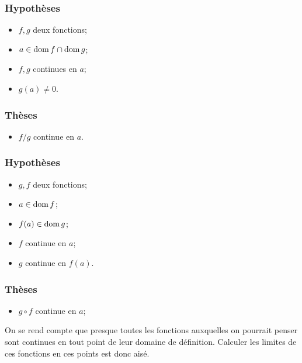 \documentclass[main.tex]{subfiles}
\begin{document}
\begin{proposition}

    \subsubsection{Hypothèses}
    \begin{itemize}
        \item $f, g$ deux fonctions;
        \item $a \in \operatorname{dom} f \cap \operatorname{dom} g$;
        \item $f ,g$ continues en $a$;
        \item $g(a) \ne 0$.
    \end{itemize}

    \subsubsection{Thèses}
    \begin{itemize}
        \item $f/g$ continue en $a$.
    \end{itemize}
\end{proposition}

\begin{proposition}

    \subsubsection{Hypothèses}
    \begin{itemize}
        \item $g, f$ deux fonctions;
        \item $a \in \operatorname{dom} f$;
        \item $f(a) \in \operatorname{dom} g$;
        \item $f$ continue en $a$;
        \item $g$ continue en $f(a)$.
    \end{itemize}

    \subsubsection{Thèses}
    \begin{itemize}
        \item $g \circ f$ continue en $a$;
    \end{itemize}
\end{proposition}

On se rend compte que presque toutes les fonctions auxquelles on pourrait penser sont continues en tout point de leur domaine de définition.
Calculer les limites de ces fonctions en ces points est donc aisé.
\end{document}
